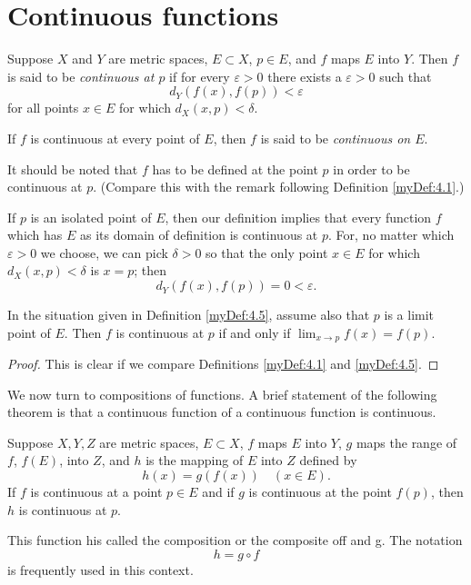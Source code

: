 
\section{Continuous functions}

\begin{myDef}
    \label{myDef:4.5}
    Suppose $X$ and $Y$ are metric spaces, $E \subset X$, $p \in E$, and $f$ maps $E$ into $Y$. Then $f$ is said to be \emph{continuous at $p$} if for every $\varepsilon > 0$ there exists a $\varepsilon > 0$ such that
    \begin{equation*}
        d_Y (f(x), f(p)) < \varepsilon
    \end{equation*}
    for all points $x \in  E$ for which $d_X(x, p) < \delta$.
    
    If $f$ is continuous at every point of $E$, then $f$ is said to be \emph{continuous on $E$}.
    
    It should be noted that $f$ has to be defined at the point $p$ in order to be continuous at $p$. (Compare this with the remark following Definition \ref{myDef:4.1}.)

    If $p$ is an isolated point of $E$, then our definition implies that every function $f$ which has $E$ as its domain of definition is continuous at $p$. For, no matter which $\varepsilon > 0$ we choose, we can pick $\delta > 0$ so that the only point $x \in  E$ for which $d_X(x,p) <\delta$ is $x = p$; then
    \begin{equation*}
        d_Y(f(x),f(p)) = 0 < \varepsilon.
    \end{equation*}
\end{myDef}

\begin{thm}
    \label{thm:4.6}
    In the situation given in Definition \ref{myDef:4.5}, assume also that $p$ is a limit point of $E$. Then $f$ is continuous at $p$ if and only if $\lim_{x \to p}  f(x) = f(p)$.
\end{thm}
\begin{proof}
    This is clear if we compare Definitions \ref{myDef:4.1} and \ref{myDef:4.5}.
\end{proof}


We now turn to compositions of functions. 
A brief statement of the following theorem is that a continuous function of a continuous function is continuous.
\begin{thm}
    \label{thm:4.7}
    Suppose $X, Y, Z$ are metric spaces, $E \subset X$, $f$ maps $E$ into $Y$, $g$ maps the range of $f$, $f(E)$, into $Z$, and $h$ is the mapping of $E$ into $Z$ defined by 
    \begin{equation*}
        h(x) = g(f(x)) \quad
    (x \in  E).
    \end{equation*}
    If $f$ is continuous at a point $p \in E$ and if $g$ is continuous at the point $f(p)$, then $h$ is continuous at $p$.

    This function his called the composition or the composite off and g. The notation
    \begin{equation*}
        h = g \circ f
    \end{equation*}
    is frequently used in this context.
\end{thm}

